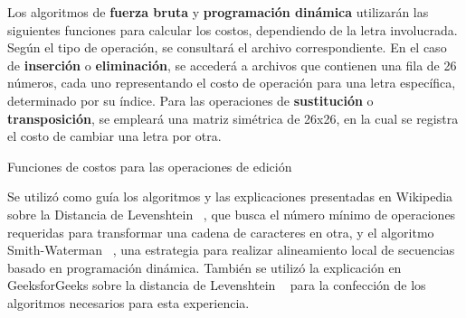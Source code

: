 Los algoritmos de \textbf{fuerza bruta} y \textbf{programación dinámica} utilizarán las siguientes funciones para calcular los costos, dependiendo de la letra involucrada. Según el tipo de operación, se consultará el archivo correspondiente. En el caso de \textbf{inserción} o \textbf{eliminación}, se accederá a archivos que contienen una fila de 26 números, cada uno representando el costo de operación para una letra específica, determinado por su índice. Para las operaciones de \textbf{sustitución} o \textbf{transposición}, se empleará una matriz simétrica de 26x26, en la cual se registra el costo de cambiar una letra por otra. 

\begin{algorithm}[H]
    
    \DontPrintSemicolon
    \footnotesize
    
    
    
    
    
    
    \caption{Funciones de costos para las operaciones de edición}
    \label{alg:funcionesCostos}
\end{algorithm}


Se utilizó como guía los algoritmos y las explicaciones presentadas en Wikipedia sobre la Distancia de Levenshtein ~\cite{eswiki:157799255}, que busca el número mínimo de operaciones requeridas para transformar una cadena de caracteres en otra, y el algoritmo Smith-Waterman ~\cite{eswiki:160948078}, una estrategia para realizar alineamiento local de secuencias basado en programación dinámica. También se utilizó la explicación en GeeksforGeeks sobre la distancia de Levenshtein ~\cite{zaidkhan15_levenshtein} para la confección de los algoritmos necesarios para esta experiencia.
